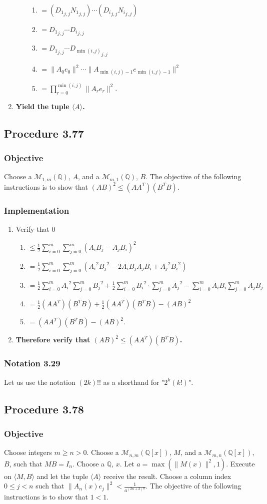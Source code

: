 \documentclass[twocolumn]{article}
\newcommand{\notation}[1]{\subsubsection*{Notation #1}}
\newcommand{\procedure}[2][]{\subsection*{Procedure #2 \ifthenelse{\equal{#1}{}}{}{(#1)}}\label{sec:procedure #2}}
\newcommand{\objective}{\subsubsection*{Objective}}
\newcommand{\implementation}{\subsubsection*{Implementation}}
\newcommand{\procedurehr}[2][]{\hyperref[sec:procedure #2]{\ifthenelse{\equal{#1}{}}{procedure #2}{#1}}}
\begin{document}
\begin{enumerate}
\begin{enumerate}
\begin{enumerate}
							\item $=({D_1}_{j,j}{N_1}_{j,j})\cdots ({D_i}_{j,j}{N_i}_{j,j})$
							\item $={D_1}_{j,j}\cdots {D_i}_{j,j}$
							\item $={D_1}_{j,j}\cdots {D_{\min(i,j)}}_{j,j}$
							\item $=\lVert A_0e_0\rVert^2\cdots\lVert A_{\min(i,j)-1}e_{\min(i,j)-1}\rVert^2$
							\item $=\prod_{r=0}^{\min(i,j)}\lVert A_re_{r}\rVert^2$.
						\end{enumerate}
					\end{enumerate}
					\item \textbf{Yield the tuple $\langle A\rangle$.}
				\end{enumerate}
		\procedure{3.77}
			\objective
				Choose a $\mathcal{M}_{1,m}(\mathbb{Q})$, $A$, and a $\mathcal{M}_{m,1}(\mathbb{Q})$, $B$. The objective of the following instructions is to show that $(AB)^2\le(AA^T)(B^TB)$.
			\implementation
				\begin{enumerate}
					\item Verify that $0$
					\begin{enumerate}
						\item $\le\frac{1}{2}\sum_{i=0}^m\sum_{j=0}^m (A_iB_j-A_jB_i)^2$
						\item $=\frac{1}{2}\sum_{i=0}^m\sum_{j=0}^m ({A_i}^2{B_j}^2-2A_iB_jA_jB_i+{A_j}^2{B_i}^2)$
						\item $=\frac{1}{2}\sum_{i=0}^m {A_i}^2\sum_{j=0}^m {B_j}^2+\frac{1}{2}\sum_{i=0}^m {B_i}^2\cdot\allowbreak\sum_{j=0}^m {A_j}^2-\sum_{i=0}^m A_iB_i\sum_{j=0}^m A_jB_j$
						\item $=\frac{1}{2}(AA^T)(B^TB)+\frac{1}{2}(AA^T)(B^TB)-(AB)^2$
						\item $=(AA^T)(B^TB)-(AB)^2$.
					\end{enumerate}
					\item \textbf{Therefore verify that $(AB)^2\le(AA^T)(B^TB)$.}
				\end{enumerate}
		\notation{3.29}
			Let us use the notation $(2k)!!$ as a shorthand for "$2^k(k!)$".
		\procedure{3.78}
			\objective
				Choose integers $m\ge n>0$. Choose a $\mathcal{M}_{n,m}(\mathbb{Q}[x])$, $M$, and a $\mathcal{M}_{m,n}(\mathbb{Q}[x])$, $B$, such that $MB=I_n$. Choose a $\mathbb{Q}$, $x$. Let $a=\max(\lVert M(x)\rVert^2,1)$. Execute \procedurehr{3.76} on $\langle M,B\rangle$ and let the tuple $\langle A\rangle$ receive the result. Choose a column index $0\le j<n$ such that $\lVert A_n(x)e_j\rVert^2<\frac{1}{a^{(2n+2)!!}}$. The objective of the following instructions is to show that $1<1$.
\end{document}
